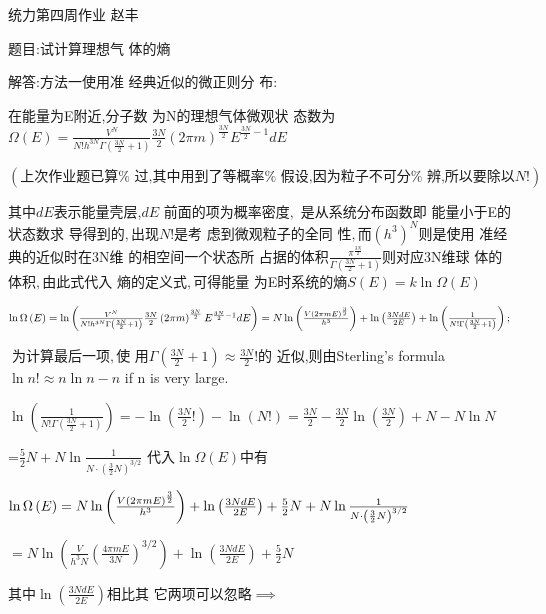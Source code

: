 \documentclass{ctexart}
\begin{document}
\bigskip 统力第四周作业 \qquad 
赵丰

\bigskip 题目:试计算理想气%
体的熵

解答:方法一\qquad 使用准%
经典近似的微正则分%
布:

在能量为E附近,分子数%
为N的理想气体微观状%
态数为$\Omega \left( E\right) =\frac{V^{N}}{N!h^{3N}\Gamma
\left( \frac{3N}{2}+1\right) }\frac{3N}{2}\left( 2\pi m\right) ^{\frac{3N}{2}%
}E^{\frac{3N}{2}-1}dE$

$\left( \text{上次作业题已算%
过,其中用到了等概率%
假设,因为粒子不可分%
辨,所以要除以}N\text{!}\right) $

其中$dE$表示能量壳层,$dE$%
前面的项为概率密度$,$%
是从系统分布函数即%
能量小于E的状态数求%
导得到的$,$出现$N!$是考%
虑到微观粒子的全同%
性$,$而$\left( h^{3}\right) ^{N}$则是使用%
准经典的近似时在3N维%
的相空间一个状态所%
占据的体积$\frac{\pi ^{\frac{3N}{2}}}{\Gamma
\left( \frac{3N}{2}+1\right) }$则对应3N维球%
体的体积$,$由此式代入%
熵的定义式$,$可得能量%
为E时系统的熵$S\left( E\right) =k\ln
\Omega \left( E\right) $

$\ln \Omega \left( E\right) =\ln \left( \frac{V^{N}}{N!h^{3N}\Gamma \left( 
\frac{3N}{2}+1\right) }\frac{3N}{2}\left( 2\pi m\right) ^{\frac{3N}{2}}E^{%
\frac{3N}{2}-1}dE\right) =N\ln \left( \frac{V\left( 2\pi mE\right) ^{\frac{3%
}{2}}}{h^{3}}\right) +\ln \left( \frac{3NdE}{2E}\right) +\ln \left( \frac{1}{%
N!\Gamma \left( \frac{3N}{2}+1\right) }\right) ;$

$\;$为计算最后一项$,$使%
用$\Gamma \left( \frac{3N}{2}+1\right) \approx \frac{3N}{2}!$的%
近似,则由Sterling's formula $\ln n!\approx n\ln n-n$
if n is very large.

$\ln \left( \frac{1}{N!\Gamma \left( \frac{3N}{2}+1\right) }\right) =-\ln
\left( \frac{3N}{2}!\right) -\ln \left( N!\right) =\frac{3N}{2}-\frac{3N}{2}%
\ln \left( \frac{3N}{2}\right) +N-N\ln N$

=$\frac{5}{2}N+N\ln \frac{1}{N\cdot \left( \frac{3}{2}N\right) ^{3/2}}$%
代入$\ln \Omega \left( E\right) $中有

$\ln \Omega \left( E\right) =N\ln \left( \frac{V\left( 2\pi mE\right) ^{%
\frac{3}{2}}}{h^{3}}\right) +\ln \left( \frac{3NdE}{2E}\right) +\frac{5}{2}%
N+N\ln \frac{1}{N\cdot \left( \frac{3}{2}N\right) ^{3/2}}$

$=N\ln \left( \frac{V}{h^{3}N}\left( \frac{4\pi mE}{3N}\right) ^{3/2}\right)
+\ln \left( \frac{3NdE}{2E}\right) +\frac{5}{2}N$

其中$\ln \left( \frac{3NdE}{2E}\right) $相比其%
它两项可以忽略$\implies $
\end{document}
